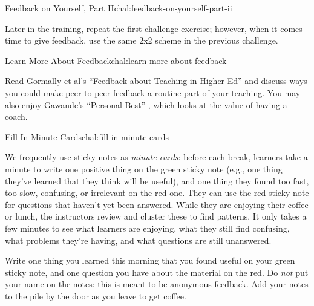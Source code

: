 \begin{challenge}{Feedback on Yourself, Part II}{chal:feedback-on-yourself-part-ii}

Later in the training, repeat the first challenge exercise; however,
when it comes time to give feedback, use the same 2x2 scheme in the
previous challenge.
\end{challenge}

\begin{challenge}{Learn More About Feedback}{chal:learn-more-about-feedback}

Read Gormally et al's
``Feedback about Teaching in Higher Ed'' \cite{bib:gormally-teaching-feedback}
and discuss ways you could make peer-to-peer feedback a routine part of your teaching.
You may also enjoy Gawande's ``Personal Best'' \cite{bib:gawande-personal-best},
which looks at the value of having a coach.
\end{challenge}

\begin{challenge}{Fill In Minute Cards}{chal:fill-in-minute-cards}

We frequently use sticky notes as \emph{minute cards}: before each
break, learners take a minute to write one positive thing on the green
sticky note (e.g., one thing they've learned that they think will be
useful), and one thing they found too fast, too slow, confusing, or
irrelevant on the red one. They can use the red sticky note for
questions that haven't yet been answered. While they are enjoying their
coffee or lunch, the instructors review and cluster these to find
patterns. It only takes a few minutes to see what learners are enjoying,
what they still find confusing, what problems they're having, and what
questions are still unanswered.

Write one thing you learned this morning that you found useful on your
green sticky note, and one question you have about the material on the
red. Do \emph{not} put your name on the notes: this is meant to be
anonymous feedback. Add your notes to the pile by the door as you leave
to get coffee.
\end{challenge}
